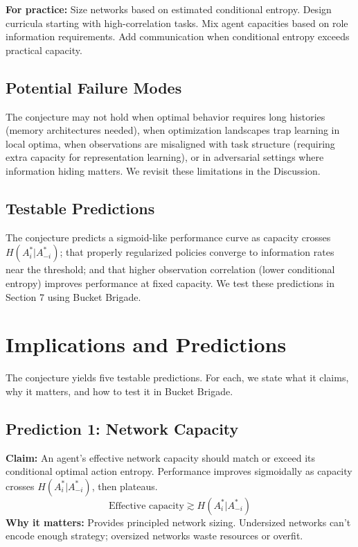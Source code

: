 \documentclass[10pt, letterpaper]{article}
\begin{document}
\textbf{For practice:} Size networks based on estimated conditional entropy. Design curricula starting with high-correlation tasks. Mix agent capacities based on role information requirements. Add communication when conditional entropy exceeds practical capacity.

\subsection{Potential Failure Modes}

The conjecture may not hold when optimal behavior requires long histories (memory architectures needed), when optimization landscapes trap learning in local optima, when observations are misaligned with task structure (requiring extra capacity for representation learning), or in adversarial settings where information hiding matters. We revisit these limitations in the Discussion.

\subsection{Testable Predictions}

The conjecture predicts a sigmoid-like performance curve as capacity crosses $H(A_i^*|A_{-i}^*)$; that properly regularized policies converge to information rates near the threshold; and that higher observation correlation (lower conditional entropy) improves performance at fixed capacity. We test these predictions in Section 7 using Bucket Brigade.

\section{Implications and Predictions}
\label{sec:implications}

The conjecture yields five testable predictions. For each, we state what it claims, why it matters, and how to test it in Bucket Brigade.

\subsection{Prediction 1: Network Capacity}
\label{pred:capacity}

\textbf{Claim:} An agent's effective network capacity should match or exceed its conditional optimal action entropy. Performance improves sigmoidally as capacity crosses $H(A_i^*|A_{-i}^*)$, then plateaus.
\[\text{Effective capacity} \gtrsim H(A_i^*|A_{-i}^*)\]
\textbf{Why it matters:} Provides principled network sizing. Undersized networks can't encode enough strategy; oversized networks waste resources or overfit.
\end{document}
